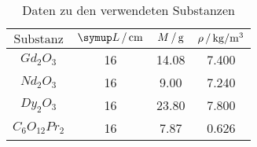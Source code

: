 \begin{table}
  \centering
  \begin{tabular}{c c c c}
    \toprule
    $\text{Substanz}$ & $\su{L}\,/\,\si{\centi\meter}$ & $M\,/\,\si{\gram}$ & $\rho \,/\,\si{\kilo\gram\per\cubic\meter}$ \\
    \midrule
    $Gd_2O_3$ & 16 & 14.08 & 7.400 \\
    $Nd_2O_3$ & 16 & 9.00  & 7.240 \\
    $Dy_2O_3$ & 16 & 23.80 & 7.800 \\
    $C_6O_{12}Pr_2$ & 16 & 7.87 & 0.626 \\
    \bottomrule
  \end{tabular}
  \caption{Daten zu den verwendeten Substanzen}
  \label{tab:Daten}
\end{table}
